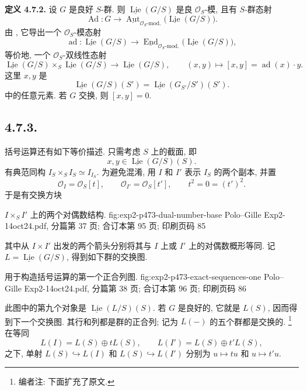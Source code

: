 \medskip
\noindent{}\textbf{定义 4.7.2.}
设 \(G\) 是良好 \(S\)-群. 则
\(\underline{\operatorname{Lie}}(G/S)\) 是良
\(\mathcal O_S\)-模, 且有 \(S\)-群态射
\[
 \operatorname{Ad}:G\longrightarrow
 \underline{\operatorname{Aut}}_{\mathcal O_S\text{-mod.}}
   \bigl(\underline{\operatorname{Lie}}(G/S)\bigr).
\]
由 , 它导出一个 \(\mathcal O_S\)-模态射
\[
 \operatorname{ad}:
 \underline{\operatorname{Lie}}(G/S)
 \longrightarrow
 \underline{\operatorname{End}}_{\mathcal O_S\text{-mod.}}
   \bigl(\underline{\operatorname{Lie}}(G/S)\bigr),
\]
等价地, 一个 \(\mathcal O_S\)-双线性态射
\[
 \underline{\operatorname{Lie}}(G/S)
 \times_S
 \underline{\operatorname{Lie}}(G/S)
 \longrightarrow
 \underline{\operatorname{Lie}}(G/S),
 \qquad
 (x,y)\longmapsto[x,y]=\operatorname{ad}(x)\cdot y.
\]
这里 \(x,y\) 是
\[
 \underline{\operatorname{Lie}}(G/S)(S')
 =
 \underline{\operatorname{Lie}}(G_{S'}/S')(S').
\]
中的任意元素. 若 \(G\) 交换, 则 \([x,y]=0\).

\subsection*{4.7.3.}
括号运算还有如下等价描述. 只需考虑 \(S\) 上的截面, 即
\[
 x,y\in\underline{\operatorname{Lie}}(G/S)(S).
\]
有典范同构
\(I_S\times_SI_S\simeq I_{I_S}\). 为避免混淆, 用 \(I\) 和
\(I'\) 表示 \(I_S\) 的两个副本, 并置
\[
 \mathcal O_I=\mathcal O_S[t],
 \qquad
 \mathcal O_{I'}=\mathcal O_S[t'],
 \qquad
 t^2=0=(t')^2.
\]
于是有交换方块

  {\(I\times_S I'\) 上的两个对偶数结构.}
  {fig:exp2-p473-dual-number-base}
  {Polo--Gille Exp2-14oct24.pdf, 分篇第 37 页; 合订本第 95 页; 印刷页码 85}

其中从 \(I\times I'\) 出发的两个箭头分别将其与
\(I\) 上或 \(I'\) 上的对偶数概形等同.
记 \(L=\underline{\operatorname{Lie}}(G/S)\), 得到如下群的交换图.

  {用于构造括号运算的第一个正合列图.}
  {fig:exp2-p473-exact-sequences-one}
  {Polo--Gille Exp2-14oct24.pdf, 分篇第 38 页; 合订本第 96 页; 印刷页码 86}

此图中的第九个对象是
\(\underline{\operatorname{Lie}}(L/S)(S)\). 若 \(G\) 是良好的,
它就是 \(L(S)\), 因而得到下一个交换图. 其行和列都是群的正合列;
记为 \(L(-)\) 的五个群都是交换的.
\footnote{编者注: 下面扩充了原文.} 在等同
\[
 L(I)=L(S)\oplus tL(S),
 \qquad
 L(I')=L(S)\oplus t'L(S),
\]
之下, 单射 \(L(S)\hookrightarrow L(I)\) 和
\(L(S)\hookrightarrow L(I')\) 分别为 \(u\mapsto tu\) 和
\(u\mapsto t'u\).

